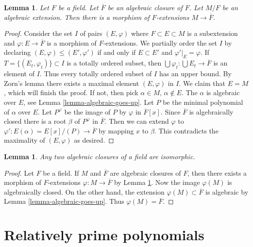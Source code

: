 \documentclass{stacks-project}
\theoremstyle{plain}
\newtheorem{lemma}[subsection]{Lemma}
\theoremstyle{definition}
\theoremstyle{remark}
\numberwithin{equation}{subsection}
\begin{document}
\begin{lemma}
\label{lemma-map-into-algebraic-closure}
Let $F$ be a field. Let $\overline{F}$ be an algebraic closure of $F$.
Let $M/F$ be an algebraic extension. Then there is a morphism of
$F$-extensions $M \to \overline{F}$.
\end{lemma}

\begin{proof}
Consider the set $I$ of pairs $(E, \varphi)$ where $F \subset E \subset M$
is a subextension and $\varphi : E \to \overline{F}$ is a morphism of
$F$-extensions. We partially order the set $I$ by declaring
$(E, \varphi) \leq (E', \varphi')$ if and only if $E \subset E'$ and
$\varphi'|_E = \varphi$. If $T = \{(E_t,  \varphi_t)\} \subset I$
is a totally ordered subset, then
$\bigcup \varphi_t : \bigcup E_t \to \overline{F}$ is an element of $I$.
Thus every totally ordered subset of $I$ has an upper bound.
By Zorn's lemma there exists a maximal element $(E, \varphi)$ in $I$.
We claim that $E = M$, which will finish the proof. If not, then
pick $\alpha \in M$, $\alpha \not \in E$. The $\alpha$ is algebraic
over $E$, see Lemma \ref{lemma-algebraic-goes-up}.
Let $P$ be the minimal polynomial of $\alpha$ over $E$.
Let $P^\varphi$ be the image of $P$ by $\varphi$ in $\overline{F}[x]$.
Since $\overline{F}$ is algebraically closed there is a root $\beta$
of $P^\varphi$ in $\overline{F}$. Then we can extend $\varphi$ to
$\varphi' : E(\alpha) = E[x]/(P) \to \overline{F}$ by mapping
$x$ to $\beta$. This contradicts the maximality of $(E, \varphi)$
as desired.
\end{proof}

\begin{lemma}
\label{lemma-algebraic-closures-isomorphic}
Any two algebraic closures of a field are isomorphic.
\end{lemma}

\begin{proof}
Let $F$ be a field. If $M$ and $\overline{F}$ are algebraic closures of
$F$, then there exists a morphism of $F$-extensions
$\varphi : M \to \overline{F}$ by
Lemma \ref{lemma-map-into-algebraic-closure}.
Now the image $\varphi(M)$ is algebraically closed.
On the other hand, the extension $\varphi(M) \subset \overline{F}$
is algebraic by Lemma \ref{lemma-algebraic-goes-up}.
Thus $\varphi(M) = \overline{F}$.
\end{proof}





\section{Relatively prime polynomials}
\label{section-relatively-prime}
\end{document}
